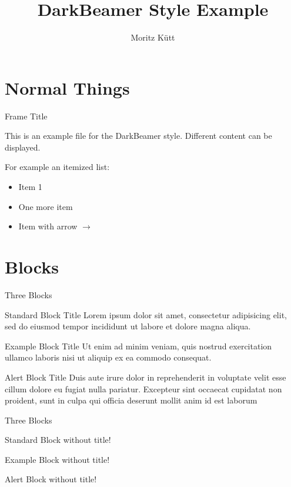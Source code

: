 \documentclass[xcolor=dvipsnames]{beamer}
\title{DarkBeamer Style Example}
\author[M. Kütt]{Moritz Kütt}
\begin{document}
\frame[plain]{\titlepage}


\section{Normal Things}
\begin{frame}{Frame Title}

This is an example file for the DarkBeamer style. Different content can be displayed.

For example an itemized list:
\begin{itemize}
\item Item 1
\item One more item
\item Item with arrow \(\rightarrow\) 
\end{itemize}
\end{frame}

\section{Blocks}

\begin{frame}{Three Blocks}

\begin{block}{Standard Block Title}
Lorem ipsum dolor sit amet, consectetur adipisicing elit, sed do eiusmod tempor incididunt ut labore et dolore magna aliqua. 
\end{block}

\begin{exampleblock}{Example Block Title}
Ut enim ad minim veniam, quis nostrud exercitation ullamco laboris nisi ut aliquip ex ea commodo consequat. 
\end{exampleblock}

\begin{alertblock}{Alert Block Title}
Duis aute irure dolor in reprehenderit in voluptate velit esse cillum dolore eu fugiat nulla pariatur. Excepteur sint occaecat cupidatat non proident, sunt in culpa qui officia deserunt mollit anim id est laborum
\end{alertblock}

\end{frame} 

\begin{frame}{Three Blocks}

\begin{block}{}
Standard Block without title!
\end{block}

\begin{exampleblock}{}
Example Block without title!
\end{exampleblock}

\begin{alertblock}{}
Alert Block without title!
\end{alertblock}

\end{frame}
\end{document}

